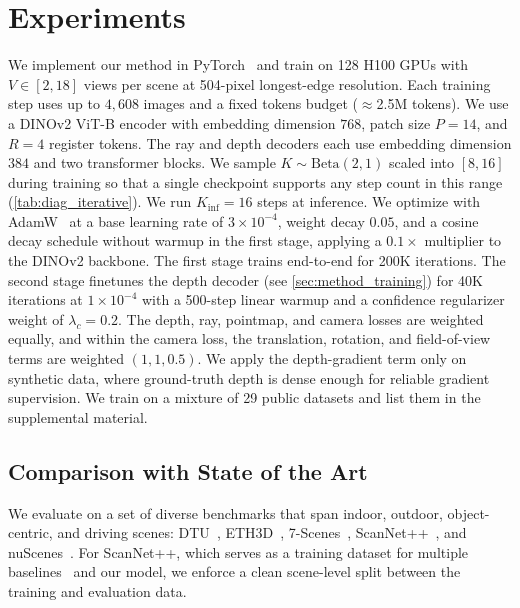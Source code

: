 \section{Experiments}
\label{sec:experiments}


We implement our method in PyTorch~\citep{paszke2019pytorch} and train on 128 H100 GPUs with $V \in [2, 18]$ views per scene at 504-pixel longest-edge resolution. Each training step uses up to $4{,}608$ images and a fixed tokens budget ($\approx$2.5M tokens).
We use a DINOv2 ViT-B encoder with embedding dimension $768$, patch size $P{=}14$, and $R{=}4$ register tokens. The ray and depth decoders each use embedding dimension $384$ and two transformer blocks.
We sample $K \sim \text{Beta}(2, 1)$ scaled into $[8, 16]$ during training so that a single checkpoint supports any step count in this range (\cref{tab:diag_iterative}). We run $K_\text{inf} = 16$ steps at inference.
We optimize with AdamW~\citep{loshchilov2018decoupled} at a base learning rate of $3 \times 10^{-4}$, weight decay $0.05$, and a cosine decay schedule without warmup in the first stage, applying a $0.1\times$ multiplier to the DINOv2 backbone.
The first stage trains end-to-end for 200K iterations. The second stage finetunes the depth decoder (see \cref{sec:method_training}) for 40K iterations at $1 \times 10^{-4}$ with a 500-step linear warmup and a confidence regularizer weight of $\lambda_c = 0.2$.
The depth, ray, pointmap, and camera losses are weighted equally, and within the camera loss, the translation, rotation, and field-of-view terms are weighted $(1, 1, 0.5)$. 
We apply the depth-gradient term only on synthetic data, where ground-truth depth is dense enough for reliable gradient supervision. We train on a mixture of 29 public datasets and list them in the supplemental material.

\subsection{Comparison with State of the Art}
\label{sec:sota}

We evaluate on a set of diverse benchmarks that span indoor, outdoor, object-centric, and driving scenes:
DTU~\citep{jensen2014dtu},
ETH3D~\citep{schops2017eth3d},
7-Scenes~\citep{shotton2013scene},
ScanNet++~\citep{yeshwanth2023scannetpp},
and nuScenes~\citep{caesar2020nuscenes}. For ScanNet++, which serves as a training dataset for multiple baselines~\citep{lin2025depth, wang2025pi, keetha2026mapanything, duisterhof2024mast3rsfm, leroy2025grounding, vggt_omega} and our model, we enforce a clean scene-level split between the training and evaluation data.

